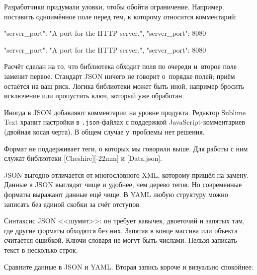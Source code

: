 Разработчики придумали уловки, чтобы обойти ограничение. Например, поставить
одноимённое поле перед тем, к которому относится комментарий:

\ifx\devicetype\mobile

\begin{english}
  \begin{json}
{
    "server_port":
    "A port for the HTTP server.",
    "server_port": 8080
}
  \end{json}
\end{english}

\else

\begin{english}
  \begin{json}
{
    "server_port": "A port for the HTTP server.",
    "server_port": 8080
}
  \end{json}
\end{english}
\fi


Расчёт сделан на то, что библиотека обходит поля по очереди и~второе поле
заменит первое. Стандарт JSON ничего не говорит о~порядке полей; приём остаётся
на ваш риск. Логика библиотеки может быть иной, например бросить исключение или
пропустить ключ, который уже обработан.

Иногда в JSON добавляют комментарии на уровне продукта. Редактор Sublime Text
хранит настройки в \verb|.json|-файлах с поддержкой JavaScript-комментариев (двойная
косая черта). В общем случае у~проблемы нет решения.


Формат не поддерживает теги, о которых мы говорили выше. Для работы с ним служат
библиотеки
[Cheshire][-22mm] и
[Data.json].

JSON выгодно отличается от многословного XML, которому пришёл на замену. Данные
в JSON выглядят чище и удобнее, чем дерево тегов. Но современные форматы
выражают данные ещё чище. В YAML любую структуру можно записать без единой
скобки за счёт отступов.

Синтаксис JSON <<шумит>>: он требует кавычек, двоеточий и запятых там, где
другие форматы обходятся без них. Запятая в конце массива или объекта считается
ошибкой. Ключи словаря не могут быть числами. Нельзя записать текст в несколько
строк.

Сравните данные в JSON и YAML. Вторая запись короче и визуально спокойнее:

\ifx\devicetype\mobile

